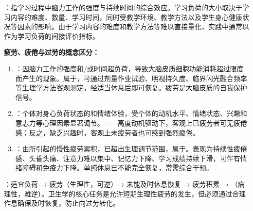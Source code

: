 \begin{defbox}
：指学习过程中脑力工作的强度与持续时间的综合效应。学习负荷的大小取决于学习内容的难度、数量、学习时间，同时受教学环境、教学方法以及学生身心健康状况等因素的影响。由于学习内容的难度和教学方法等难以直接量化，实践中通常以作为学习负荷的间接评价指标。
\end{defbox}

\begin{keybox}
\textbf{疲劳、疲倦与过劳的概念区分：}

\begin{enumerate}[leftmargin=*]
    \item {}：因脑力工作的强度和/或时间超负荷，导致大脑皮质细胞功能消耗超过限度而产生的现象。属于，可通过剂量作业试验、明视持久度、临界闪光融合频率等生理学方法客观测定，经适当休息后即可恢复。疲劳是大脑皮质的自我保护信号。
    \item {}：个体对身心负荷状态的和情绪体验，受个体的动机水平、情绪状态、兴趣和意志力等心理因素显著调节。——高度动机驱动下，客观上已疲劳者可无疲倦感；反之，缺乏兴趣时，客观上未疲劳者也可感到强烈疲倦。
    \item {}：由所引起的慢性疲劳累积，已超出生理调节范围，属于。表现为持续性疲倦感、头昏头痛、注意力难以集中、记忆力下降、学习成绩持续下滑，可伴有情绪障碍和免疫力下降。单纯休息已不能完全恢复，常需综合干预。
\end{enumerate}

：适宜负荷 → 疲劳（生理性，可逆）→ 未能及时休息恢复 → 疲劳积累 → （病理性，难逆）。卫生学的核心任务是允许短期生理性疲劳的发生，但必须通过合理作息确保及时恢复，防止向过劳转化。
\end{keybox}

